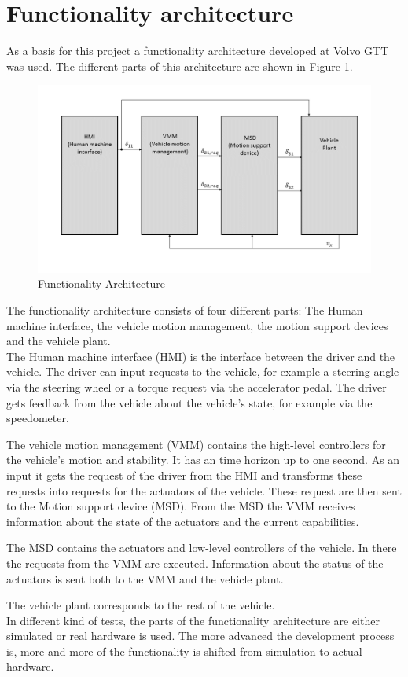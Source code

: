 \documentclass[ExampleMasters.tex]{subfiles}
\begin{document}
\section{Functionality architecture}
\label{sec:func_architecture}

As a basis for this project a functionality architecture developed at Volvo GTT was used. The different parts of this architecture are shown in Figure \ref{fig:funct_architecture}.

\begin{figure}[!htb]
	\centering
	\includegraphics[width=1\linewidth]{figures/functionality_architecture}
	
	\caption{Functionality Architecture}
	\label{fig:funct_architecture}
\end{figure}

The functionality architecture consists of four different parts: The Human machine interface, the vehicle motion management, the motion support devices and the vehicle plant.\\
The Human machine interface (HMI) is the interface between the driver and the vehicle. The driver can input requests to the vehicle, for example a steering angle via the steering wheel or a torque request via the accelerator pedal. The driver gets feedback from the vehicle about the vehicle's state, for example via the speedometer.

The vehicle motion management (VMM) contains the high-level controllers for the vehicle's motion and stability. It has an time horizon up to one second. As an input it gets the request of the driver from the HMI and transforms these requests into requests for the actuators of the vehicle. These request are then sent to the Motion support device (MSD). From the MSD the VMM receives information about the state of the actuators and the current capabilities.

The MSD contains the actuators and low-level controllers of the vehicle. In there the requests from the VMM are executed. Information about the status of the actuators is sent both to the VMM and the vehicle plant.

The vehicle plant corresponds to the rest of the vehicle.
\\
In different kind of tests, the parts of the functionality architecture are either simulated or real hardware is used. The more advanced the development process is, more and more of the functionality is shifted from simulation to actual hardware.
\end{document}
